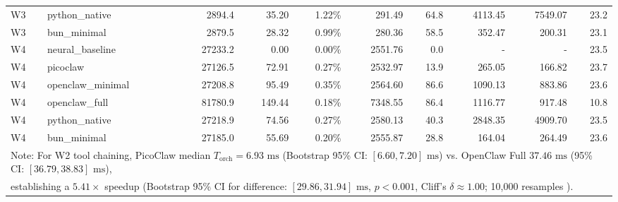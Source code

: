 \begin{table}[t]
\begin{tabular}{llrrrrrrrr}
W3 & python\_native & 2894.4 & 35.20 & 1.22\% & 291.49 & 64.8 & 4113.45 & 7549.07 & 23.2 \\
W3 & bun\_minimal & 2879.5 & 28.32 & 0.99\% & 280.36 & 58.5 & 352.47 & 200.31 & 23.1 \\
\midrule
W4 & neural\_baseline & 27233.2 & 0.00 & 0.00\% & 2551.76 & 0.0 & - & - & 23.5 \\
W4 & picoclaw & 27126.5 & 72.91 & 0.27\% & 2532.97 & 13.9 & 265.05 & 166.82 & 23.7 \\
W4 & openclaw\_minimal & 27208.8 & 95.49 & 0.35\% & 2564.60 & 86.6 & 1090.13 & 883.86 & 23.6 \\
W4 & openclaw\_full & 81780.9 & 149.44 & 0.18\% & 7348.55 & 86.4 & 1116.77 & 917.48 & 10.8 \\
W4 & python\_native & 27218.9 & 74.56 & 0.27\% & 2580.13 & 40.3 & 2848.35 & 4909.70 & 23.5 \\
W4 & bun\_minimal & 27185.0 & 55.69 & 0.20\% & 2555.87 & 28.8 & 164.04 & 264.49 & 23.6 \\
\midrule
\multicolumn{10}{l}{\footnotesize Note: For W2 tool chaining, PicoClaw median $T_{\text{orch}} = 6.93\text{ ms}$ (Bootstrap 95\% CI: $[6.60, 7.20]\text{ ms}$) vs. OpenClaw Full $37.46\text{ ms}$ (95\% CI: $[36.79, 38.83]\text{ ms}$),} \\
\multicolumn{10}{l}{\footnotesize establishing a $5.41\times$ speedup (Bootstrap 95\% CI for difference: $[29.86, 31.94]\text{ ms}$, $p < 0.001$, Cliff's $\delta \approx 1.00$; 10,000 resamples \cite{efron1979}).} \\
\bottomrule
\end{tabular}
\end{table}
